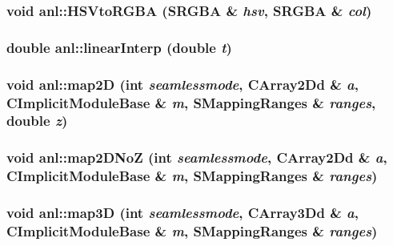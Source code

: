 \label{namespaceanl_a6251423b45b56c17ffa27b6ee9d3a252}
\hypertarget{namespaceanl_a976e18dba36a60b909fbce5ea118e1c9}{
\subsubsection[{HSVtoRGBA}]{\setlength{\rightskip}{0pt plus 5cm}void anl::HSVtoRGBA (SRGBA \& {\em hsv}, \/  SRGBA \& {\em col})}}
\label{namespaceanl_a976e18dba36a60b909fbce5ea118e1c9}
\hypertarget{namespaceanl_a68b907cc1000b730d772b56d99ccc41f}{
\subsubsection[{linearInterp}]{\setlength{\rightskip}{0pt plus 5cm}double anl::linearInterp (double {\em t})}}
\label{namespaceanl_a68b907cc1000b730d772b56d99ccc41f}
\hypertarget{namespaceanl_a3d840e0e33cfc9405a1e53a11c1666ea}{
\subsubsection[{map2D}]{\setlength{\rightskip}{0pt plus 5cm}void anl::map2D (int {\em seamlessmode}, \/  {\bf CArray2Dd} \& {\em a}, \/  CImplicitModuleBase \& {\em m}, \/  SMappingRanges \& {\em ranges}, \/  double {\em z})}}
\label{namespaceanl_a3d840e0e33cfc9405a1e53a11c1666ea}
\hypertarget{namespaceanl_a99f38fb4a2dbc54ed805b5665fb76c91}{
\subsubsection[{map2DNoZ}]{\setlength{\rightskip}{0pt plus 5cm}void anl::map2DNoZ (int {\em seamlessmode}, \/  {\bf CArray2Dd} \& {\em a}, \/  CImplicitModuleBase \& {\em m}, \/  SMappingRanges \& {\em ranges})}}
\label{namespaceanl_a99f38fb4a2dbc54ed805b5665fb76c91}
\hypertarget{namespaceanl_a3b9cec8b101907ef6fd902f040fbc6dd}{
\subsubsection[{map3D}]{\setlength{\rightskip}{0pt plus 5cm}void anl::map3D (int {\em seamlessmode}, \/  {\bf CArray3Dd} \& {\em a}, \/  CImplicitModuleBase \& {\em m}, \/  SMappingRanges \& {\em ranges})}}

